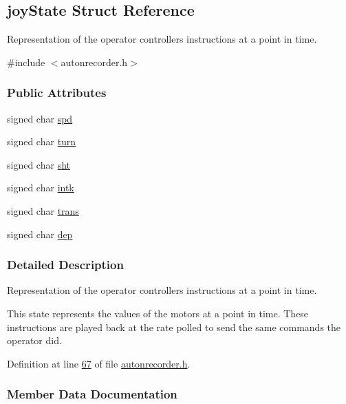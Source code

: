 \hypertarget{structjoy_state}{}\subsection{joy\+State Struct Reference}
\label{structjoy_state}


Representation of the operator controller\textquotesingle{}s instructions at a point in time.  




{\ttfamily \#include $<$autonrecorder.\+h$>$}

\subsubsection*{Public Attributes}
\begin{DoxyCompactItemize}
\item 
signed char \hyperlink{structjoy_state_a7867156ddb5bc22d57010c5af00c98af}{spd}
\item 
signed char \hyperlink{structjoy_state_aacdbb758b97190220423402f63020483}{turn}
\item 
signed char \hyperlink{structjoy_state_a751363be4e40b27bcbe558f41a15fe91}{sht}
\item 
signed char \hyperlink{structjoy_state_a2314ed43be31ccc565381efd8398b921}{intk}
\item 
signed char \hyperlink{structjoy_state_acc4f7bae078e8c8b7840cda61382c7cf}{trans}
\item 
signed char \hyperlink{structjoy_state_a3ba5ee3c4eec0e2ee03338b397a17958}{dep}
\end{DoxyCompactItemize}


\subsubsection{Detailed Description}
Representation of the operator controller\textquotesingle{}s instructions at a point in time. 

This state represents the values of the motors at a point in time. These instructions are played back at the rate polled to send the same commands the operator did. 

Definition at line \hyperlink{autonrecorder_8h_source_l00067}{67} of file \hyperlink{autonrecorder_8h_source}{autonrecorder.\+h}.



\subsubsection{Member Data Documentation}
